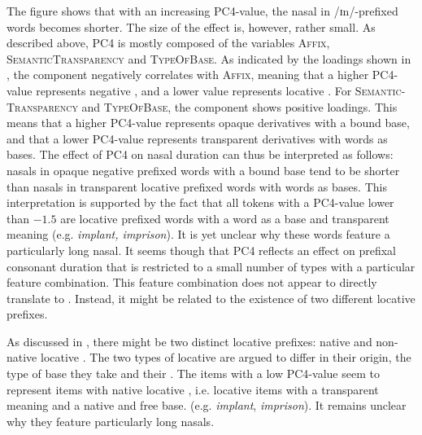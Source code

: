 The figure shows that with an increasing \textsc{PC4}-value, the nasal in /ɪn/-prefixed words becomes shorter. The size of the effect is, however, rather small. 
As described above, \textsc{PC4} is mostly composed of the variables \textsc{Affix}, \textsc{SemanticTransparency} and \textsc{TypeOfBase}. As indicated by the loadings shown in , the component negatively correlates with \textsc{Affix}, meaning that a higher \textsc{PC4}-value represents negative , and a lower value represents locative . For \textsc{Semantic- Transparency} and \textsc{TypeOfBase}, the component shows positive loadings. This means that a higher \textsc{PC4}-value represents opaque derivatives with a bound base, and that a lower \textsc{PC4}-value represents transparent derivatives with words as bases.
The effect of \textsc{PC4} on nasal duration can thus be interpreted as follows: nasals in opaque negative prefixed words with a bound base tend to be shorter than nasals in transparent locative prefixed words with words as bases. This interpretation is supported by the fact that all tokens with a \textsc{PC4}-value lower than $-1.5$ are locative prefixed words with a word as a base and transparent meaning (e.g. \textit{implant, imprison}). It is yet unclear why these words feature a particularly long nasal. 
It seems though that \textsc{PC4} reflects an effect on prefixal consonant duration that is restricted to a small number of types with a particular feature combination. This feature combination does not appear to directly translate to .  
Instead, it might be related to the existence of two different locative prefixes. 

As discussed in , there might be two distinct locative prefixes: native and non-native locative . The two types of locative  are argued to differ in their origin, the type of base they take and their . The items with a low \textsc{PC4}-value seem to represent items with native locative , i.e. locative items with a transparent meaning and a native and free base. (e.g. \textit{implant}, \textit{imprison}). It remains unclear why they feature particularly long nasals.



